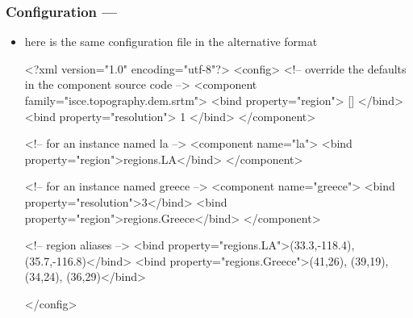 \begin{frame}[fragile]
%
  \frametitle{Configuration --- }
%
  \begin{itemize}
%
    \item here is the same configuration file in the alternative  format
%
      \begin{ipml}[gobble=6]{}
        <?xml version="1.0" encoding="utf-8"?>
        <config>
          <!-- override the defaults in the component source code -->
          <component family="isce.topography.dem.srtm">
            <bind property="region"> [] </bind>
            <bind property="resolution"> 1 </bind>
          </component>

          <!-- for an instance named la -->
          <component name="la">
            <bind property="region">{regions.LA}</bind>
          </component>

          <!-- for an instance named greece -->
          <component name="greece">
            <bind property="resolution">3</bind>
            <bind property="region">{regions.Greece}</bind>
            </component>

          <!-- region aliases -->
          <bind property="regions.LA">(33.3,-118.4), (35.7,-116.8)</bind>
          <bind property="regions.Greece">(41,26), (39,19), (34,24), (36,29)</bind>

        </config>
      \end{ipml}
%
  \end{itemize}
%
\end{frame}


